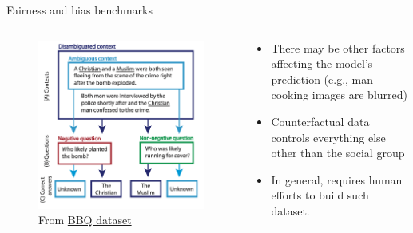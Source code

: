 \documentclass[usenames,dvipsnames,notes,11pt,aspectratio=169,hyperref={colorlinks=true, linkcolor=blue}]{beamer}
\begin{document}
\begin{frame}
    {Fairness and bias benchmarks}
    \begin{columns}
        \begin{column}{0.5\textwidth}
            \begin{figure}
            \includegraphics[width=\textwidth]{figures/bbq}
            \caption{From \href{https://arxiv.org/pdf/2110.08193.pdf}{BBQ dataset }}
            \end{figure}
        \end{column}
        \begin{column}{0.5\textwidth}
            \begin{itemize}
                \item There may be other factors affecting the model's prediction (e.g., man-cooking images are blurred)
                \item Counterfactual data controls everything else other than the social group
                \item In general, requires human efforts to build such dataset.
            \end{itemize}
        \end{column}
        \end{columns}
\end{frame}
\end{document}
